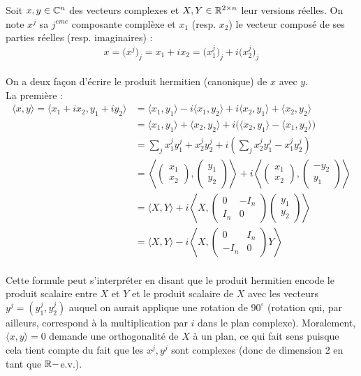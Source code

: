 Soit $x,y\in\mathbb{C}^n$ des vecteurs complexes et $X,Y\in\mathbb{R}^{2\times n}$ leur versions réelles. On note $x^j$ sa $j^{eme}$ composante complèxe et $x_1$ (resp. $x_2$) le vecteur composé de ses parties réelles (resp. imaginaires) :
\[x = \big(x^j\big)_j =  x_1 + ix_2 =  \big(x^j_1\big)_j +i \big(x^j_2\big)_j\]
\\
On a deux façon d'écrire le produit hermitien (canonique) de $x$ avec $y$.
\\
La première :
\begin{align*}
\langle x,y \rangle = \langle x_1 + ix_2, y_1 + iy_2\rangle &= \langle x_1, y_1\rangle - i \langle x_1,y_2\rangle +i\langle x_2, y_1\rangle + \langle x_2, y_2\rangle  \\
&= \langle x_1, y_1\rangle + \langle x_2, y_2\rangle 
+ i\big(\langle x_2, y_1\rangle - \langle x_1,y_2\rangle\big) \\
&= \sum_j x^j_1 y^j_1+ x^j_2 y^j_2
+ i\left(\sum_j x^j_2 y^j_1 -  x^j_1y^j_2\right) \\
&= \left\langle \begin{pmatrix} x_1 \\ x_2 \end{pmatrix},\begin{pmatrix} y_1 \\ y_2 \end{pmatrix}\right\rangle
+ i\left\langle \begin{pmatrix} x_1 \\ x_2 \end{pmatrix},\begin{pmatrix} -y_2 \\ y_1 \end{pmatrix}\right\rangle \\
&= \Big\langle X,Y\Big\rangle 
+ i\left\langle X,\begin{pmatrix} 0 & -I_n \\ I_n & 0 \end{pmatrix}\begin{pmatrix} y_1 \\ y_2 \end{pmatrix}\right\rangle\\
&= \Big\langle X,Y\Big\rangle 
- i\left\langle X,\begin{pmatrix} 0 & I_n \\ -I_n & 0 \end{pmatrix}Y\right\rangle
\end{align*}
\\
Cette formule peut s’interpréter en disant que le produit hermitien encode le produit scalaire entre $X$ et $Y$ et le produit scalaire de $X$ avec les vecteurs $y^j=(y^j_1, y^j_2)$  auquel on aurait applique une rotation de $90^\circ$ (rotation qui, par ailleurs, correspond à la multiplication par $i$ dans le plan complexe). Moralement, $\langle x,y \rangle =0$ demande une orthogonalité de $X$ à un plan, ce qui fait sens puisque cela tient compte du fait que les $x^j, y^j$ sont complexes (donc de dimension 2 en tant que $\mathbb{R}-$e.v.).
